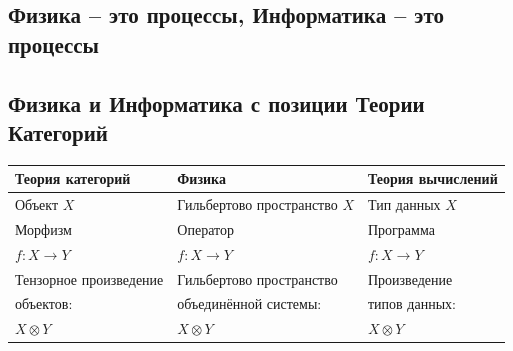 \documentclass[a0,portrait]{a0poster}
\newcommand{\maps}{\colon}
\newcommand{\tensor}{\otimes}
\begin{document}
\begin{multicols}{2}
\color{Black} %

\section{Физика -- это процессы, Информатика -- это процессы}
\subsection{Физика и Информатика с позиции Теории Категорий}

\begin{center}
 


\begin{tabular}{l l l}
\toprule
\textbf{Теория категорий} & \textbf{Физика} & \textbf{Теория вычислений}\\
\midrule
Объект $X$       &
Гильбертово пространство $X$  &
Тип данных $X$
\\
\hline
Морфизм &
Оператор &
Программа  \\
$f\maps X \to Y$ &
$f\maps X \to Y$ &
$f \maps X \to Y$
\\
\hline
Тензорное произведение  &
Гильбертово пространство    &
 Произведение 
\\
объектов: &
объединённой системы: &
типов данных: 
\\
$X \tensor Y$ &
$X \tensor Y$ &
$X \tensor Y$ \\


\end{tabular}
\end{center}
\end{multicols}
\end{document}
